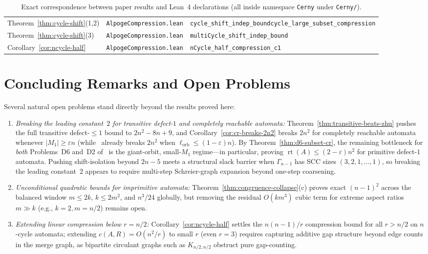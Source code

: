 \documentclass[11pt,a4paper]{article}
\theoremstyle{definition}
\theoremstyle{remark}
\newcommand{\rt}{\operatorname{rt}}
\newcommand{\lorb}{\ell_{\mathrm{orb}}}
\begin{document}
\begin{table}[ht]
\begin{tabular}{@{}>{\raggedright\arraybackslash}p{2.75cm}>{\raggedright\arraybackslash}p{3.65cm}>{\raggedright\arraybackslash}p{9.05cm}@{}}
\midrule
Theorem~\ref{thm:cycle-shift}(1,2) & \texttt{AlpogeCompression.lean} & \texttt{cycle\_shift\_indep\_bound}\newline \texttt{cycle\_large\_subset\_compression} \\
Theorem~\ref{thm:cycle-shift}(3) & \texttt{AlpogeCompression.lean} & \texttt{multiCycle\_shift\_indep\_bound} \\
Corollary~\ref{cor:ncycle-half} & \texttt{AlpogeCompression.lean} & \texttt{nCycle\_half\_compression\_c1} \\
\bottomrule
\end{tabular}
\caption{Exact correspondence between paper results and Lean~4 declarations (all inside namespace \texttt{Cerny} under \texttt{Cerny/}).}
\label{tab:lean-map}
\end{table}

\section{Concluding Remarks and Open Problems}\label{sec:conclusion}

Several natural open problems stand directly beyond the results proved here:
\begin{enumerate}[leftmargin=*,nosep]
  \item \emph{Breaking the leading constant~$2$ for transitive defect-$1$ and completely reachable automata:} Theorem~\ref{thm:transitive-beats-zhu} pushes the full transitive defect-$\le 1$ bound to $2n^2 - 8n + 9$, and Corollary~\ref{cor:cr-breaks-2n2} breaks $2n^2$ for completely reachable automata whenever $|M_1| \ge \varepsilon n$ (while~\cite{FS2025} already breaks $2n^2$ when $\lorb \le (1 - \varepsilon)n$). By Theorem~\ref{thm:d6-subset-cr}, the remaining bottleneck for \emph{both} Problems~D6 and~D2 of~\cite{Volkov2026} is the giant-orbit, small-$M_1$ regime---in particular, proving $\rt(A) \le (2 - \varepsilon)n^2$ for primitive defect-$1$ automata. Pushing shift-isolation beyond $2n - 5$ meets a structural slack barrier when $\Gamma_{n - 1}$ has SCC sizes $(3, 2, 1, \dots, 1)$, so breaking the leading constant~$2$ appears to require multi-step Schreier-graph expansion beyond one-step coarsening.
  \item \emph{Unconditional quadratic bounds for imprimitive automata:} Theorem~\ref{thm:congruence-collapse}(c) proves exact $(n - 1)^2$ across the balanced window $m \le 2k,\, k \le 2m^2$, and $n^3 / 24$ globally, but removing the residual $O(k m^3)$ cubic term for extreme aspect ratios $m \gg k$ (e.g., $k = 2, m = n/2$) remains open.
  \item \emph{Extending linear compression below $r = n / 2$:} Corollary~\ref{cor:ncycle-half} settles the $n(n - 1)/r$ compression bound for all $r > n / 2$ on $n$-cycle automata; extending $c(A, R) = O(n^2 / r)$ to small $r$ (even $r = 3$) requires capturing additive gap structure beyond edge counts in the merge graph, as bipartite circulant graphs such as $K_{n/2, n/2}$ obstruct pure gap-counting.
\end{enumerate}
\end{document}
